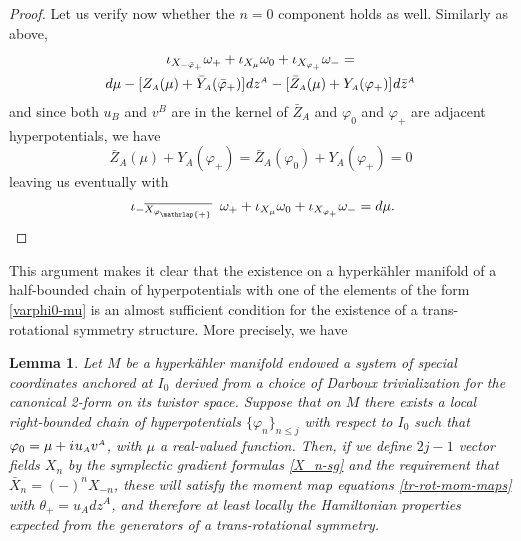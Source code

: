 \documentclass[11pt]{amsart}
\newtheorem{lemma}[theorem]{Lemma}
\theoremstyle{remark}
\theoremstyle{remark}
\theoremstyle{definition}
\theoremstyle{definition}
\theoremstyle{definition}
\newcommand{\0}{{\scriptstyle 0'}} %
\newcommand{\1}{{\scriptstyle 1'}}
\newcommand{\A}{{\scriptscriptstyle A}} %
\newcommand{\B}{{\scriptscriptstyle B}}
\newcommand{\hp}{\hspace{0.5pt}} %
\begin{document}
\begin{proof}
Let us verify now whether the $n=0$ component holds as well. Similarly as above,
\begin{gather}
\iota_{X_{-\bar{\varphi}_{+}}} \omega_+ + \iota_{X_{\mu}} \omega_0 + \iota_{X_{\varphi_{+}}} \omega_- = \\
d\mu -  [Z_{\A}(\mu) + \bar{Y}_{\A}(\bar{\varphi}_+)] \hp dz^{\A} - [\bar{Z}_{\A}(\mu) + Y_{\A}(\varphi_+)] \hp d\bar{z}^{\A} \nonumber
\end{gather}
and since both $u_{\B}$ and $v^{\B}$ are in the kernel of $\bar{Z}_{\A}$ and $\varphi_0$ and $\varphi_+$ are adjacent hyperpotentials, we have
\begin{equation}
\bar{Z}_{\A}(\mu) + Y_{\A}(\varphi_+) = \bar{Z}_{\A}(\varphi_0) + Y_{\A}(\varphi_+) = 0
\end{equation}
leaving us eventually with 
\begin{equation}
\iota_{\raisebox{0pt}[0pt]{\scriptsize $- \overline{X_{\varphi_{\mathrlap{+}}}}$}} \hspace{5pt} \omega_+ + \iota_{X_{\mu}} \omega_0 + \iota_{X_{\varphi_+}} \omega_- = d\mu \rlap{.} \qedhere
\end{equation}
\end{proof}

\smallskip

\noindent This argument makes it clear that the existence on a hyperk\"ahler manifold of a half-bounded chain of hyperpotentials with one of the elements of the form \eqref{varphi0-mu} is an almost sufficient condition for the existence of a trans-rotational symmetry structure. 
More precisely, we have

\begin{lemma} \label{trapp}
Let $M$ be a hyperk\"ahler manifold endowed a system of special coordinates anchored at $I_0$ derived from a choice of Darboux trivialization for the canonical 2-form on its twistor space. Suppose that on $M$ there exists a local right-bounded chain of hyperpotentials $\{\varphi_n\}_{n \leq j}$ with respect to $I_0$ such that $\varphi_0 = \mu + i \hp u_{\A} v^{\A}$, with $\mu$ a real-valued function. Then, if we define \mbox{$2j-1$} vector fields $X_n$ by the symplectic gradient formulas \eqref{X_n-sg} and the requirement that $\bar{X}_n = (-)^n X_{-n}$, these will satisfy the moment map equations \eqref{tr-rot-mom-maps} with $\theta_+ = u_{\A} dz^{\A}$, and therefore at least locally the Hamiltonian properties expected from the generators of a trans-rotational symmetry.
\end{lemma}
\end{document}
